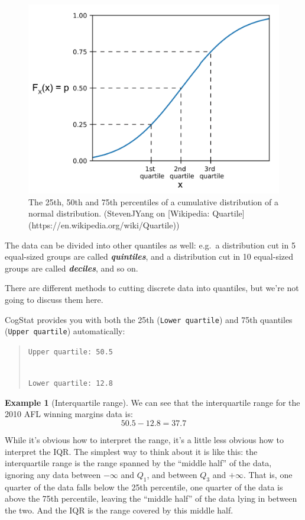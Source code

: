 \documentclass[
]{book}
\theoremstyle{definition}
\theoremstyle{definition}
\newtheorem{example}{Example}[chapter]
\theoremstyle{definition}
\theoremstyle{definition}
\theoremstyle{remark}
\begin{document}
\begin{callout}
\begin{figure}

{\centering \includegraphics[width=0.45\linewidth]{resources/image/1920px-NormalCDFQuartile3} 

}

\caption{The 25th, 50th and 75th percentiles of a cumulative distribution of a normal distribution. (StevenJYang on [Wikipedia: Quartile](https://en.wikipedia.org/wiki/Quartile))}\label{fig:unnamed-chunk-17}
\end{figure}

The data can be divided into other quantiles as well: e.g.~a distribution cut in 5 equal-sized groups are called \textbf{\emph{quintiles}}, and a distribution cut in 10 equal-sized groups are called \textbf{\emph{deciles}}, and so on.

There are different methods to cutting discrete data into quantiles, but we're not going to discuss them here.

\end{callout}

CogStat provides you with both the 25th (\texttt{Lower\ quartile}) and 75th quantiles (\texttt{Upper\ quartile}) automatically:

\begin{quote}
\texttt{Upper\ quartile:\ 50.5}\strut \\
\texttt{Lower\ quartile:\ 12.8}
\end{quote}

\begin{example}[Interquartile range]
\protect\hypertarget{exm:exIQR}{}\label{exm:exIQR}We can see that the interquartile range for the 2010 AFL winning margins data is:
\[
50.5 - 12.8 = \mathbf{37.7}
\]
\end{example}

While it's obvious how to interpret the range, it's a little less obvious how to interpret the IQR. The simplest way to think about it is like this: the interquartile range is the range spanned by the ``middle half'' of the data, ignoring any data between \(-\infty\) and \(Q_1\), and between \(Q_3\) and \(+\infty\). That is, one quarter of the data falls below the 25th percentile, one quarter of the data is above the 75th percentile, leaving the ``middle half'' of the data lying in between the two. And the IQR is the range covered by this middle half.
\end{document}
